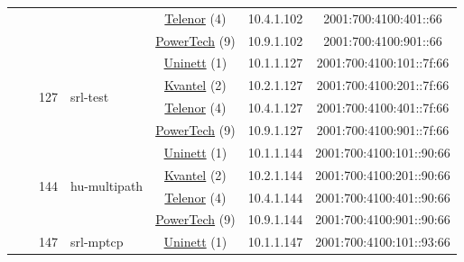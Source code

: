 \begin{small}
\begin{center}
\begin{longtable}{|c|c|c|c|c|c|c|c|}
  &  & \multicolumn{2}{|c|}{} & \multicolumn{2}{|c|}{\tiny{\href{https://www.telenor.no}{Telenor} (4)}} & \tiny{10.4.1.102} & \tiny{2001:700:4100:401::66} \\* \cline{5-5}\cline{6-6}\cline{7-7}\cline{8-8}
  &  & \multicolumn{2}{|c|}{} & \multicolumn{2}{|c|}{\tiny{\href{http://www.powertech.no}{PowerTech} (9)}} & \tiny{10.9.1.102} & \tiny{2001:700:4100:901::66} \\* \cline{3-3}\cline{4-4}\cline{5-5}\cline{6-6}\cline{7-7}\cline{8-8}
  &  & \multirow{4}{*}{\tiny{127}} & \multicolumn{1}{|l|}{\multirow{4}{*}{\tiny{srl-test}}} & \multicolumn{2}{|c|}{\tiny{\href{https://www.uninett.no}{Uninett} (1)}} & \tiny{10.1.1.127} & \tiny{2001:700:4100:101::7f:66} \\* \cline{5-5}\cline{6-6}\cline{7-7}\cline{8-8}
  &  &  &  & \multicolumn{2}{|c|}{\tiny{\href{http://kvantel.no}{Kvantel} (2)}} & \tiny{10.2.1.127} & \tiny{2001:700:4100:201::7f:66} \\* \cline{5-5}\cline{6-6}\cline{7-7}\cline{8-8}
  &  &  &  & \multicolumn{2}{|c|}{\tiny{\href{https://www.telenor.no}{Telenor} (4)}} & \tiny{10.4.1.127} & \tiny{2001:700:4100:401::7f:66} \\* \cline{5-5}\cline{6-6}\cline{7-7}\cline{8-8}
  &  &  &  & \multicolumn{2}{|c|}{\tiny{\href{http://www.powertech.no}{PowerTech} (9)}} & \tiny{10.9.1.127} & \tiny{2001:700:4100:901::7f:66} \\* \cline{3-3}\cline{4-4}\cline{5-5}\cline{6-6}\cline{7-7}\cline{8-8}
  &  & \multirow{4}{*}{\tiny{144}} & \multicolumn{1}{|l|}{\multirow{4}{*}{\tiny{hu-multipath}}} & \multicolumn{2}{|c|}{\tiny{\href{https://www.uninett.no}{Uninett} (1)}} & \tiny{10.1.1.144} & \tiny{2001:700:4100:101::90:66} \\* \cline{5-5}\cline{6-6}\cline{7-7}\cline{8-8}
  &  &  &  & \multicolumn{2}{|c|}{\tiny{\href{http://kvantel.no}{Kvantel} (2)}} & \tiny{10.2.1.144} & \tiny{2001:700:4100:201::90:66} \\* \cline{5-5}\cline{6-6}\cline{7-7}\cline{8-8}
  &  &  &  & \multicolumn{2}{|c|}{\tiny{\href{https://www.telenor.no}{Telenor} (4)}} & \tiny{10.4.1.144} & \tiny{2001:700:4100:401::90:66} \\* \cline{5-5}\cline{6-6}\cline{7-7}\cline{8-8}
  &  &  &  & \multicolumn{2}{|c|}{\tiny{\href{http://www.powertech.no}{PowerTech} (9)}} & \tiny{10.9.1.144} & \tiny{2001:700:4100:901::90:66} \\* \cline{3-3}\cline{4-4}\cline{5-5}\cline{6-6}\cline{7-7}\cline{8-8}
  &  & \multirow{4}{*}{\tiny{147}} & \multicolumn{1}{|l|}{\multirow{4}{*}{\tiny{srl-mptcp}}} & \multicolumn{2}{|c|}{\tiny{\href{https://www.uninett.no}{Uninett} (1)}} & \tiny{10.1.1.147} & \tiny{2001:700:4100:101::93:66} \\* \cline{5-5}\cline{6-6}\cline{7-7}\cline{8-8}

\end{longtable}
\end{center}
\end{small}
